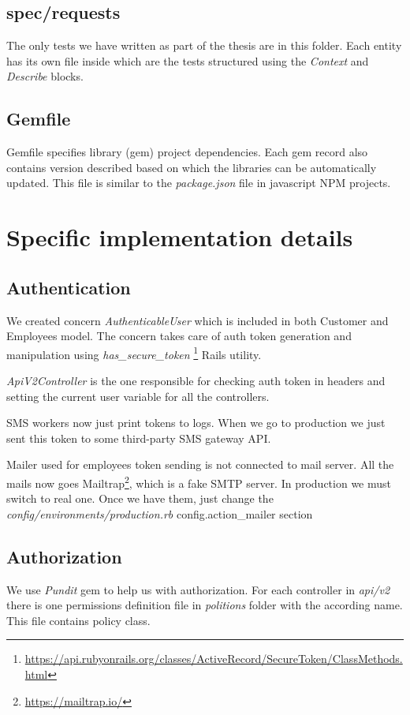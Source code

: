 	\subsection{spec/requests}
		The only tests we have written as part of the thesis are in this folder. Each entity has its own file inside which are the tests structured using the \textit{Context} and \textit{Describe} blocks.
	\subsection{Gemfile}
		Gemfile specifies library (gem) project dependencies. Each gem record also contains version described based on which the libraries can be automatically updated. This file is similar to the \textit{package.json} file in javascript NPM projects.
\section {Specific implementation details}
\subsection {Authentication}
We created concern \textit{AuthenticableUser} which is included in both Customer and Employees model. The concern takes care of auth token generation and manipulation using \textit{has\_secure\_token} \footnote{\url{https://api.rubyonrails.org/classes/ActiveRecord/SecureToken/ClassMethods.html}} Rails utility. 

\textit{ApiV2Controller} is the one responsible for checking auth token in headers and setting the current user variable for all the controllers.

SMS workers now just print tokens to logs. When we go to production we just sent this token to some third-party SMS gateway API.

Mailer used for employees token sending is not connected to mail server. All the mails now goes Mailtrap\footnote{\url{https://mailtrap.io/}}, which is a fake SMTP server. In production we must switch to real one. Once we have them, just change the \textit{config/environments/production.rb} config.action\_mailer section

\label{implementation_authorization}\subsection {Authorization}
We use \textit{Pundit} gem to help us with authorization. For each controller in \textit{api/v2} there is one permissions definition file in \textit{politions} folder with the according name.  This file contains policy class. 

